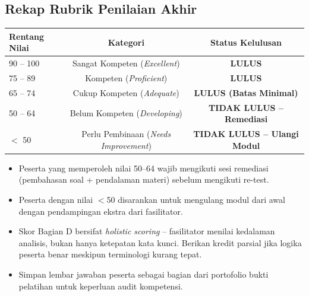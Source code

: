 \documentclass[12pt,a4paper]{report}
\begin{document}
\vspace{0.8cm}

\subsection{Rekap Rubrik Penilaian Akhir}

\renewcommand{\arraystretch}{1.3}
\begin{center}
\begin{tabularx}{0.9\textwidth}{@{} X c c @{}}
\toprule
\textbf{Rentang Nilai} & \textbf{Kategori} & \textbf{Status Kelulusan} \\
\midrule
90 -- 100 & Sangat Kompeten (\textit{Excellent}) & \textbf{LULUS} \\
75 -- 89 & Kompeten (\textit{Proficient}) & \textbf{LULUS} \\
65 -- 74 & Cukup Kompeten (\textit{Adequate}) & \textbf{LULUS (Batas Minimal)} \\
50 -- 64 & Belum Kompeten (\textit{Developing}) & \textbf{TIDAK LULUS -- Remediasi} \\
$<$ 50 & Perlu Pembinaan (\textit{Needs Improvement}) & \textbf{TIDAK LULUS -- Ulangi Modul} \\
\bottomrule
\end{tabularx}
\end{center}
\renewcommand{\arraystretch}{1.0}

\vspace{0.3cm}
\begin{plnbox}
\small
\begin{itemize}[nosep]
    \item Peserta yang memperoleh nilai 50--64 wajib mengikuti sesi remediasi (pembahasan soal + pendalaman materi) sebelum mengikuti re-test.
    \item Peserta dengan nilai $<$50 disarankan untuk mengulang modul dari awal dengan pendampingan ekstra dari fasilitator.
    \item Skor Bagian D bersifat \textit{holistic scoring} -- fasilitator menilai kedalaman analisis, bukan hanya ketepatan kata kunci. Berikan kredit parsial jika logika peserta benar meskipun terminologi kurang tepat.
    \item Simpan lembar jawaban peserta sebagai bagian dari portofolio bukti pelatihan untuk keperluan audit kompetensi.
\end{itemize}
\end{plnbox}
\end{document}
